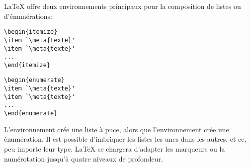 {\LaTeX} offre deux environnements principaux pour la composition de
listes ou d'énumérations:
\begin{demo}
  \begin{minipage}{0.48\linewidth}
\begin{lstlisting}
\begin{itemize}
\item `\meta{texte}'
\item `\meta{texte}'
...
\end{itemize}
\end{lstlisting}
  \end{minipage}
  \hfill
  \begin{minipage}{0.48\linewidth}
\begin{lstlisting}
\begin{enumerate}
\item `\meta{texte}'
\item `\meta{texte}'
...
\end{enumerate}
\end{lstlisting}
  \end{minipage}
\end{demo}
L'environnement  crée une liste à puce, alors que
l'environnement  crée une énumération. Il est possible
d'imbriquer les listes les unes dans les autres, et ce, peu importe
leur type. {\LaTeX} se chargera d'adapter les marqueurs ou la
numérotation jusqu'à quatre niveaux de profondeur.

